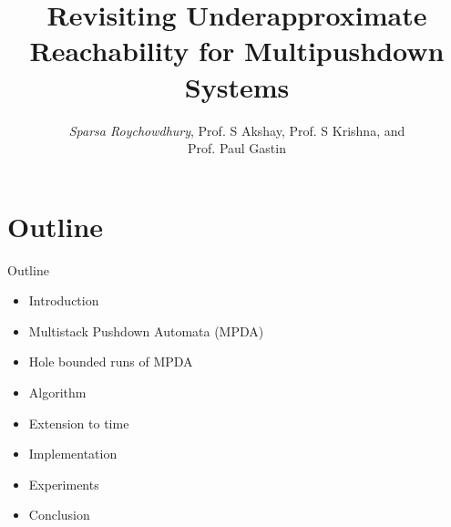 \documentclass{beamer}
\title{Revisiting Underapproximate Reachability for Multipushdown Systems} %
\author{\emph{Sparsa Roychowdhury}, Prof. S Akshay, Prof. S Krishna, and \\ Prof. Paul Gastin }
\begin{document}
  \frame{\maketitle}

   
   
  \section{Outline}
  \begin{frame}{Outline}
  \begin{itemize}
      \item Introduction
      \item Multistack Pushdown Automata (MPDA)
      \item Hole bounded runs of MPDA
      \item Algorithm 
      \item Extension to time
      \item Implementation
      \item Experiments
      \item Conclusion
  \end{itemize}
  \end{frame}
\end{document}
